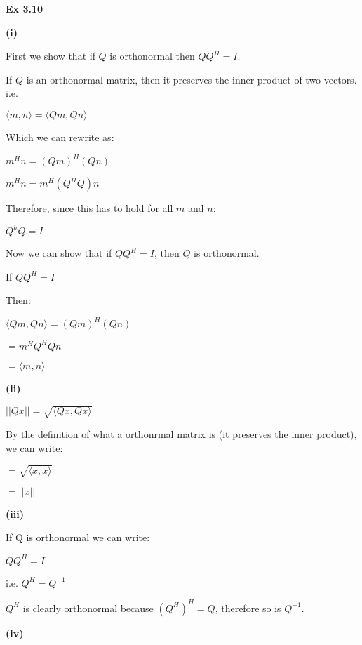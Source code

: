 \documentclass[letterpaper,12pt]{article}
\theoremstyle{definition}
\begin{document}
\begin{spacing}{1.3}{}
	
	\setlength{\leftskip}{0pt}
	
	\textbf{Ex 3.10}
	
	\setlength{\leftskip}{10pt}
	
	\textbf{(i)}
	
	\setlength{\leftskip}{20pt}
	
	First we show that if $Q$ is orthonormal then $QQ^H = I$.
	
	If $Q$ is an orthonormal matrix, then it preserves the inner product of two vectors. i.e.
	
	$\langle m, n \rangle = \langle Qm, Qn \rangle$
	
	Which we can rewrite as:
	
	$m^Hn = (Qm)^H(Qn)$
	
	$m^Hn = m^H(Q^HQ)n$
	
	Therefore, since this has to hold for all $m$ and $n$:
	
	$Q^hQ = I$
	
	Now we can show that if $QQ^H = I$, then $Q$ is orthonormal.
	
	If $QQ^H = I$
	
	Then:
	
	$\langle Qm, Qn \rangle = (Qm)^H(Qn)$
	
	$=m^HQ^HQn$
	
	$=\langle m, n \rangle$
	
	\setlength{\leftskip}{10pt}
	
	\textbf{(ii)}
	
	\setlength{\leftskip}{20pt}
	
	$||Qx|| = \sqrt{\langle Qx, Qx \rangle}$
	
	By the definition of what a orthonrmal matrix is (it preserves the inner product), we can write:
	
	$= \sqrt{\langle x, x \rangle}$
	
	
	$= ||x||$
	
	\setlength{\leftskip}{10pt}
	
	\textbf{(iii)}
	
	\setlength{\leftskip}{20pt}
	
	If Q is orthonormal we can write:
	
	$QQ^H = I$
	
	i.e. $Q^H = Q^{-1}$
	
	$Q^H$ is clearly orthonormal because $(Q^H)^H = Q$, therefore so is $Q^{-1}$.
	
	\setlength{\leftskip}{10pt}
	
	\textbf{(iv)}
	

\end{spacing}
\end{document}
